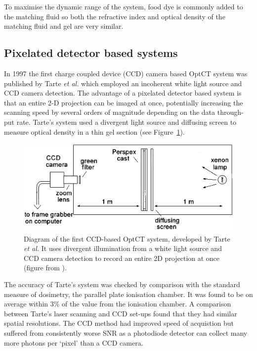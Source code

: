 \documentclass[12pt]{article}
\begin{document}
To maximise the dynamic range of the system, food dye is commonly added to the matching fluid so both the refractive index and optical density of the matching fluid and gel are very similar.\cite{Krstajic:2006kna} 




\subsection{Pixelated detector based systems}

In 1997 the first charge coupled device (CCD) camera based OptCT system was published by Tarte \textit{et al.} which employed an incoherent white light source and CCD camera detection. \cite{Tarte:2007} The advantage  of a pixelated detector based system  is that an entire 2-D projection can be imaged at once, potentially increasing the scanning speed by several  orders of magnitude depending on the data through-put rate. Tarte's system used a divergent light source and diffusing screen to measure optical density in a thin gel section (see Figure~\ref{fig:tarte_ccd_setup}). 

\begin{figure}[H]
\centering
\includegraphics[scale=0.4]{Tarte_1997_ccdsetup.jpg}
\caption{Diagram of the first CCD-based  OptCT system, developed by Tarte \textit{et al.} It uses  divergent illumination from a white light source and CCD camera detection to record an entire 2D projection at once   (figure from \cite{Tarte:2007}). }
\label{fig:tarte_ccd_setup}
\end{figure}


The accuracy of Tarte's system  was checked by comparison with the standard measure of dosimetry, the parallel plate ionisation chamber. It was found to be on average within 3\% of the value from the ionisation chamber. \cite{Tarte:2007} A comparison between Tarte's laser scanning and CCD set-ups found that they had similar spatial resolutions. The CCD method had improved speed of acquistion but suffered from consistently worse SNR as a photodiode detector can collect many more photons per `pixel' than a CCD camera. \cite{Tarte:2007}
\end{document}
